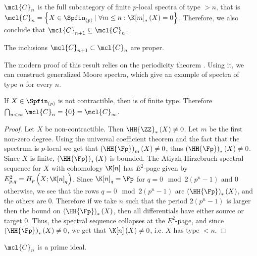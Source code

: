 \begin{corollary}
	$\mcl{C}_n$ is the full subcategory of finite $p$-local spectra of type $> n$, that is $\mcl{C}_n = \left\{ X \in \Spfin_{\left(p\right)} \mid \forall m \leq n: \K[m]_*\left(X\right) = 0 \right\}$.
	Therefore, we also conclude that $\mcl{C}_{n+1} \subseteq \mcl{C}_n$.
\end{corollary}

\begin{proposition}
	The inclusions $\mcl{C}_{n+1} \subset \mcl{C}_n$ are proper.
\end{proposition}

\begin{remark}
	The modern proof of this result relies on the periodicity theorem \cite[1.5.4]{Rav92}.
	Using it, we can construct generalized Moore spectra, which give an example of spectra of type $n$ for every $n$.
\end{remark}

\begin{proposition}
	If $X \in \Spfin_{\left(p\right)}$ is not contractible, then is of finite type.
	Therefore $\bigcap_{n < \infty} \mcl{C}_n = \left\{0\right\} = \mcl{C}_\infty$.
\end{proposition}

\begin{proof}
	Let $X$ be non-contractible.
	Then $\HH{\ZZ}_*\left(X\right) \neq 0$.
	Let $m$ be the first non-zero degree.
	Using the universal coefficient theorem and the fact that the spectrum is $p$-local we get that $\left(\HH{\Fp}\right)_m\left(X\right) \neq 0$, thus $\left(\HH{\Fp}\right)_*\left(X\right) \neq 0$.
	Since $X$ is finite, $\left(\HH{\Fp}\right)_*\left(X\right)$ is bounded.
	The Atiyah-Hirzebruch spectral sequence for $X$ with cohomology $\K[n]$ has $E^2$-page given by
	$
	E_{p,q}^2
	= 
	H_p\left(X; \K[n]_q\right)
	$.
	Since $\K[n]_q = \Fp$ for $q = 0 \mod 2\left(p^n-1\right)$ and $0$ otherwise,
	we see that the rows $q = 0 \mod 2\left(p^n-1\right)$ are $\left(\HH{\Fp}\right)_*\left(X\right)$, and the others are $0$.
	Therefore if we take $n$ such that the period $2\left(p^n-1\right)$ is larger then the bound on $\left(\HH{\Fp}\right)_*\left(X\right)$, then all differentials have either source or target $0$.
	Thus, the spectral sequence collapses at the $E^2$-page, and since $\left(\HH{\Fp}\right)_*\left(X\right) \neq 0$, we get that $\K[n]\left(X\right) \neq 0$, i.e. $X$ has type $<n$.
\end{proof}

\begin{proposition}
	$\mcl{C}_n$ is a prime ideal.
\end{proposition}

